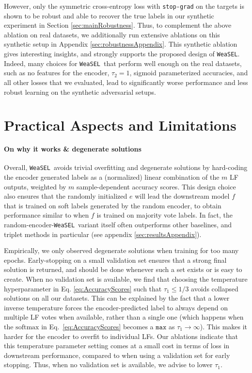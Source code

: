 \documentclass{article}
\newcommand{\softmax}{\mathrm{softmax}}
\newcommand{\weasel}{\texttt{WeaSEL}}\newcommand{\brackets}[1]{\left( #1 \right)}
\begin{document}
However, only the symmetric cross-entropy loss with \texttt{stop-grad} on the targets is shown to be robust and able to recover the true labels in our synthetic experiment in Section \ref{sec:mainRobustness}. Thus, to complement the above ablation on real datasets, we additionally run extensive ablations on this synthetic setup in Appendix \ref{sec:robustnessAppendix}. This synthetic ablation gives interesting insights, and strongly supports the proposed design of \weasel. Indeed, many choices for \weasel\ that perform well enough on the real datasets, such as no features for the encoder, $\tau_2 = 1$, sigmoid parameterized accuracies, and all other losses that we evaluated, lead to significantly worse performance and less robust learning on the synthetic adversarial setups.













 
\section{Practical Aspects and Limitations}
\label{sec:practicalAspects}
\paragraph{On why it works \& degenerate solutions}
Overall, \weasel\ avoids trivial overfitting and degenerate solutions by hard-coding the encoder generated labels as a (normalized) linear combination of the $m$ LF outputs, weighted by $m$ sample-dependent accuracy scores. 
This design choice also ensures that the randomly initialized $e$ will lead the downstream model $f$ that is trained on soft labels generated by the random encoder, to obtain performance similar to when $f$ is trained on majority vote labels. In fact, the random-encoder-\weasel\ variant itself often outperforms other baselines, and triplet methods in particular (see appendix \ref{sec:resultsAppendix}).

Empirically, we only observed degenerate solutions when training for too many epochs. Early-stopping on a small validation set ensures that a strong final solution is returned, and should be done whenever such a set exists or is easy to create. When no validation set is available, we find that choosing the temperature hyperparameter in Eq. \ref{eq:AccuracyScores} such that $\tau_1\le 1/3$ avoids collapsed solutions on all our datasets. This can be explained by the fact that a lower inverse temperature forces the encoder-predicted label to always depend on multiple LF votes when available, rather than a single one (which happens when the $\softmax$ in Eq.~\ref{eq:AccuracyScores} becomes a $\texttt{max}$ as $\tau_1 \rightarrow \infty$). This makes it harder for the encoder to overfit to individual LFs. Our ablations indicate that this temperature parameter setting comes at a small cost in terms of loss in downstream performance, compared to when using a validation set for early stopping. Thus, when no validation set is available, we advise to lower $\tau_1$.
\end{document}
